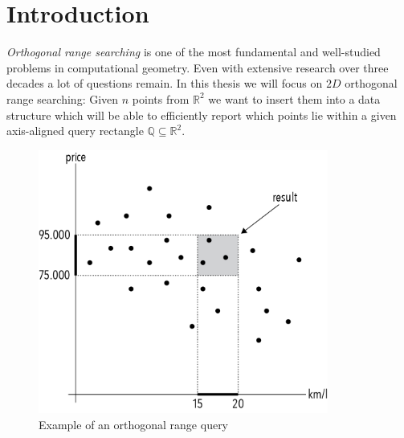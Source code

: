 \chapter{Introduction}
\label{ch:intro}

\noindent \emph{Orthogonal range searching} is one of the most fundamental and well-studied problems in computational geometry. Even with extensive research over three decades a lot of questions remain. In this thesis we will focus on $2D$ orthogonal range searching: Given $n$ points from $\mathbb{R}^2$ we want to insert them into a data structure which will be able to efficiently report which points lie within a given axis-aligned query rectangle $\mathbb{Q} \subseteq \mathbb{R}^2$.

\begin{figure}[h]
    \centering
    \includegraphics[width = 0.85\textwidth]{pictures/introduction.png}
    \caption{Example of an orthogonal range query}\label{fig:example}
\end{figure}

